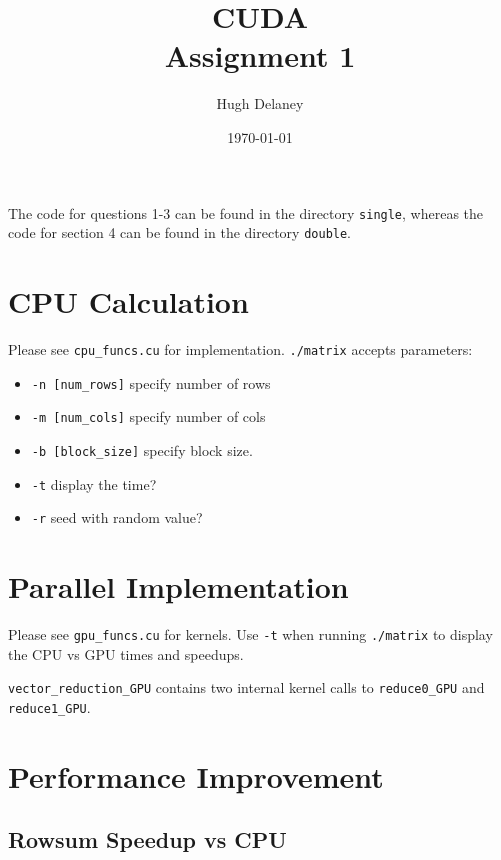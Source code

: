 \documentclass[a4paper, fleqn]{article}
\date{\today}
\author{Hugh Delaney}
\title{CUDA \\ Assignment 1}
\begin{document}
\maketitle
The code for questions 1-3 can be found in the directory \texttt{single}, whereas the code for section 4 can be found in the directory \texttt{double}.  
        \section{CPU Calculation}%
        Please see \texttt{cpu\_funcs.cu} for implementation. \texttt{./matrix} accepts parameters:
        \begin{itemize}
                \item \texttt{-n [num\_rows]} specify number of rows
                \item \texttt{-m [num\_cols]} specify number of cols
                \item \texttt{-b [block\_size]} specify block size.
                \item \texttt{-t} display the time?
                \item \texttt{-r} seed with random value?
        \end{itemize}
        \section{Parallel Implementation}%
        Please see \texttt{gpu\_funcs.cu} for kernels. Use \texttt{-t} when running \texttt{./matrix} to display the CPU vs GPU times and speedups. 

        \texttt{vector\_reduction\_GPU} contains two internal kernel calls to \texttt{reduce0\_GPU} and \texttt{reduce1\_GPU}.  
        \section{Performance Improvement}%
\subsection{Rowsum Speedup vs CPU}%
\end{document}
